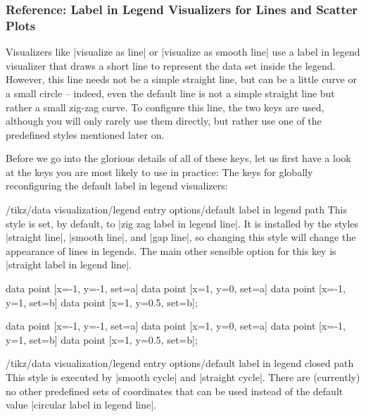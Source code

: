 \subsubsection{Reference: Label in Legend Visualizers for Lines and Scatter Plots}

Visualizers like |visualize as line| or |visualize as smooth line|
use a label in legend visualizer that draws a short line to represent
the data set inside the legend. However, this line needs not be a
simple straight line, but can be a little curve or a small circle --
indeed, even the default line is not a simple straight line but rather
a small zig-zag curve. To configure this line, the two keys
are used, although you will only rarely use them directly, but
rather use one of the predefined styles mentioned later on.

Before we go into the glorious details of all of these keys, let us
first have a look at the keys you are most likely to use in practice:
The keys for globally reconfiguring the default label in legend
visualizers:
\begin{stylekey}{/tikz/data visualization/legend entry options/default
    label in legend path}
  This style is set, by default, to |zig zag label in legend line|. It
  is installed by the styles |straight line|, |smooth line|, and
  |gap line|, so changing this style will change the appearance of lines in
  legends. The main other sensible option for this key is
  |straight label in legend line|.
\begin{codeexample}[width=5cm]
\tikz \datavisualization [
  school book axes, visualize as line/.list={a,b},
  style sheet=vary dashing,
  a={label in legend={text=a}},  b={label in legend={text=b}}]
data point [x=-1, y=-1, set=a]   data point [x=1, y=0, set=a]
data point [x=-1, y=1,  set=b]   data point [x=1, y=0.5, set=b];
\end{codeexample}
\begin{codeexample}[width=5cm]
\tikz \datavisualization [
  school book axes, visualize as line/.list={a,b},
  legend entry options/default label in legend path/.style=
    straight label in legend line,
  style sheet=vary dashing,
  a={label in legend={text=a}},  b={label in legend={text=b}}]
data point [x=-1, y=-1, set=a]   data point [x=1, y=0, set=a]
data point [x=-1, y=1,  set=b]   data point [x=1, y=0.5, set=b];
\end{codeexample}
\end{stylekey}
\begin{stylekey}{/tikz/data visualization/legend entry options/default
    label in legend closed path}
  This style is executed by |smooth cycle| and |straight cycle|. There
  are (currently) no other predefined sets of coordinates that can be
  used instead of the default value |circular label in legend line|.
\end{stylekey}

